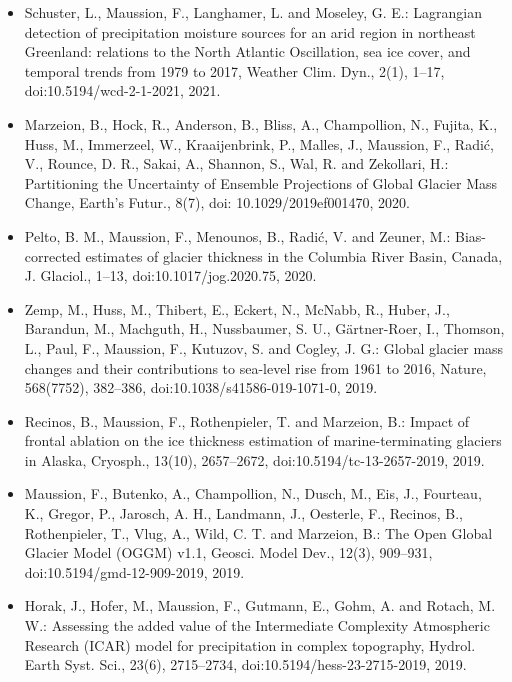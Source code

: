 \begin{footnotesize}
\begin{itemize}[nosep]
\item {} 
Schuster, L., Maussion, F., Langhamer, L. and Moseley, G. E.: Lagrangian detection of precipitation moisture sources
for an arid region in northeast Greenland: relations to the North Atlantic Oscillation, sea ice cover, and temporal
trends from 1979 to 2017, Weather Clim. Dyn., 2(1), 1--17, doi:10.5194/wcd-2-1-2021, 2021.

\item {} 
Marzeion, B., Hock, R., Anderson, B., Bliss, A., Champollion, N., Fujita, K., Huss, M., Immerzeel, W., Kraaijenbrink,
P., Malles, J., Maussion, F., Radić, V., Rounce, D. R., Sakai, A., Shannon, S., Wal, R. and Zekollari, H.:
Partitioning the Uncertainty of Ensemble Projections of Global Glacier Mass Change, Earth’s Futur., 8(7), doi:
10.1029/2019ef001470, 2020.

\item {} 
Pelto, B. M., Maussion, F., Menounos, B., Radić, V. and Zeuner, M.: Bias-corrected estimates of glacier thickness in
the Columbia River Basin, Canada, J. Glaciol., 1--13, doi:10.1017/jog.2020.75, 2020.

\item {} 
Zemp, M., Huss, M., Thibert, E., Eckert, N., McNabb, R., Huber, J., Barandun, M., Machguth, H., Nussbaumer, S. U.,
Gärtner-Roer, I., Thomson, L., Paul, F., Maussion, F., Kutuzov, S. and Cogley, J. G.: Global glacier mass changes and
their contributions to sea-level rise from 1961 to 2016, Nature, 568(7752), 382--386, doi:10.1038/s41586-019-1071-0,
2019.

\item {} 
Recinos, B., Maussion, F., Rothenpieler, T. and Marzeion, B.: Impact of frontal ablation on the ice thickness
estimation of marine-terminating glaciers in Alaska, Cryosph., 13(10), 2657--2672, doi:10.5194/tc-13-2657-2019, 2019.

\item {} 
Maussion, F., Butenko, A., Champollion, N., Dusch, M., Eis, J., Fourteau, K., Gregor, P., Jarosch, A. H., Landmann,
J., Oesterle, F., Recinos, B., Rothenpieler, T., Vlug, A., Wild, C. T. and Marzeion, B.: The Open Global Glacier
Model (OGGM) v1.1, Geosci. Model Dev., 12(3), 909--931, doi:10.5194/gmd-12-909-2019, 2019.

\item {} 
Horak, J., Hofer, M., Maussion, F., Gutmann, E., Gohm, A. and Rotach, M. W.: Assessing the added value of the
Intermediate Complexity Atmospheric Research (ICAR) model for precipitation in complex topography, Hydrol. Earth Syst.
Sci., 23(6), 2715--2734, doi:10.5194/hess-23-2715-2019, 2019.


\end{itemize}
\end{footnotesize}
